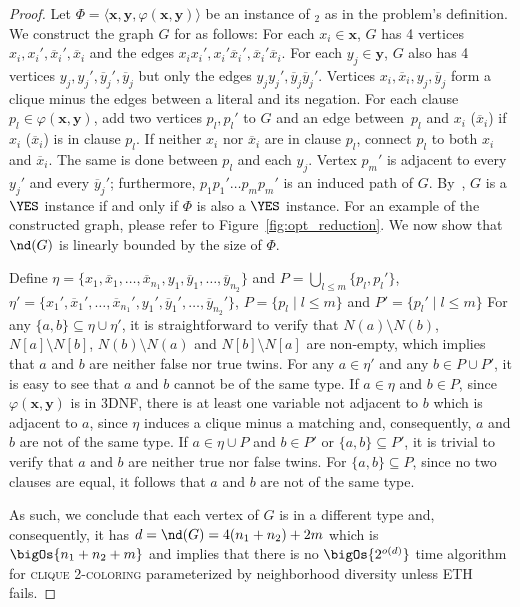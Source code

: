 \begin{proof}
    Let $\Phi = \langle\boldsymbol{x}, \boldsymbol{y}, \varphi(\boldsymbol{x},\boldsymbol{y})\rangle$ be an instance of $_2$ as in the problem's definition.
    We construct the graph $G$ for  as follows:
    For each $x_i \in \boldsymbol{x}$, $G$ has 4 vertices $x_i,x_i',\overline{x}_i',\overline{x}_i$ and the edges $x_ix_i',x_i'\overline{x}_i',\overline{x}_i'\overline{x}_i$.
    For each $y_j \in \boldsymbol{y}$, $G$ also has 4 vertices $y_j,y_j',\overline{y}_j',\overline{y}_j$ but only the edges $y_jy_j',\overline{y}_j\overline{y}_j'$.
    Vertices $x_i,\overline{x}_i, y_j, \overline{y}_j$ form a clique minus the edges between a literal and its negation.
    For each clause $p_l \in \varphi(\boldsymbol{x}, \boldsymbol{y})$, add two vertices $p_l,p_l'$ to $G$ and an edge between~$p_l$ and $x_i$ ($\overline{x}_i$) if $x_i$ ($\overline{x}_i$) is in clause $p_l$. If neither $x_i$ nor $\overline{x}_i$ are in clause $p_l$, connect $p_l$ to both $x_i$ and $\overline{x}_i$.
    The same is done between $p_l$ and each $y_j$.
    Vertex $p_m'$ is adjacent to every $y_j'$ and every $\overline{y}_j'$;
    furthermore, $p_1p_1'\dots p_mp_m'$ is an induced path of $G$.
    By~\cite{clique_coloring_complexity}, $G$ is a $\YES$ instance if and only if $\Phi$ is also a $\YES$ instance.
    For an example of the constructed graph, please refer to Figure~\ref{fig:opt_reduction}.
    We now show that $\nd(G)$ is linearly bounded by the size of $\Phi$.
    
    Define $\eta = \{x_1, \overline{x}_1, \dots, \overline{x}_{n_1}, y_1, \overline{y}_1, \dots, \overline{y}_{n_2}\}$ and $P = \bigcup_{l \leq m}\{p_l, p_l'\}$, $\eta' = \{x_1', \overline{x}_1', \dots, \overline{x}_{n_1}', y_1', \overline{y}_1', \dots, \overline{y}_{n_2}'\}$, $P = \{p_l \mid l \leq m\}$ and $P' = \{p_l' \mid l \leq m\}$
    For any $\{a,b\} \subseteq \eta \cup \eta'$, it is straightforward to verify that $N(a) \setminus N(b)$, $N[a] \setminus N[b]$, $N(b) \setminus N(a)$ and $N[b] \setminus N[a]$ are non-empty, which implies that $a$ and $b$ are neither false nor true twins.
    For any $a \in \eta'$ and any $b \in P \cup P'$, it is easy to see that $a$ and $b$ cannot be of the same type.
    If $a \in \eta$ and $b \in P$, since $\varphi(\boldsymbol{x}, \boldsymbol{y})$ is in 3DNF, there is at least one variable not adjacent to $b$ which is adjacent to $a$, since $\eta$ induces a clique minus a matching and, consequently, $a$ and $b$ are not of the same type.
    If $a \in \eta \cup P$ and $b \in P'$ or $\{a,b\} \subseteq P'$, it is trivial to verify that $a$ and $b$ are neither true nor false twins.
    For $\{a,b\} \subseteq P$, since no two clauses are equal, it follows that $a$ and $b$ are not of the same type.
    
    As such, we conclude that each vertex of $G$ is in a different type and, consequently, it has $d = \nd(G) = 4(n_1 + n_2) + 2m$ which is $\bigOs{n_1 + n_2 + m}$ and implies that there is no $\bigOs{2^{o(d)}}$ time algorithm for \textsc{clique 2-coloring} parameterized by neighborhood diversity unless ETH fails.
\end{proof}